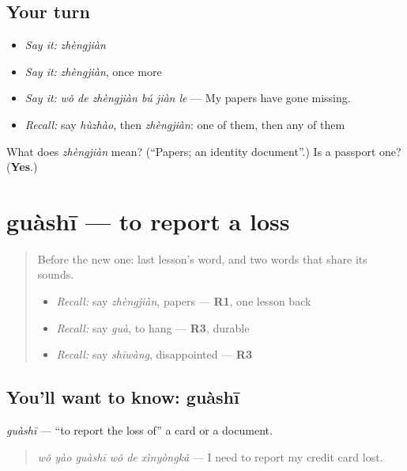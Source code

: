 \subsection*{Your turn}
\begin{itemize}
\raggedright
  \item \emph{Say it:} \emph{zhèngjiàn}
  \item \emph{Say it:} \emph{zhèngjiàn}, once more
  \item \emph{Say it:} \emph{wǒ de zhèngjiàn bú jiàn le} — My papers have gone missing.
  \item \emph{Recall:} say \emph{hùzhào}, then \emph{zhèngjiàn}: one of them, then any of them
\end{itemize}

\begin{tcolorbox}[breakable,colback=teal!4,colframe=teal!35!black,title={Before you move on}]
What does \emph{zhèngjiàn} mean? (\textquotedblleft{}Papers; an identity document\textquotedblright{}.) Is a passport one? (\textbf{Yes}.)
\end{tcolorbox}
\section[guàshī]{guàshī — to report a loss}

\label{lesson:ZH-C285-guashi}



\begin{quote}
Before the new one: last lesson's word, and two words that share its sounds.

\begin{itemize}
\raggedright
  \item \emph{Recall:} say \emph{zhèngjiàn}, papers — \textbf{R1}, one lesson back
  \item \emph{Recall:} say \emph{guà}, to hang — \textbf{R3}, durable
  \item \emph{Recall:} say \emph{shīwàng}, disappointed — \textbf{R3}
\end{itemize}
\end{quote}

\subsection*{You'll want to know: guàshī}
\emph{guàshī} — \textquotedblleft{}to report the loss of\textquotedblright{} a card or a document.

\begin{quote}
\emph{wǒ yào guàshī wǒ de xìnyòngkǎ} — I need to report my credit card lost.
\end{quote}

